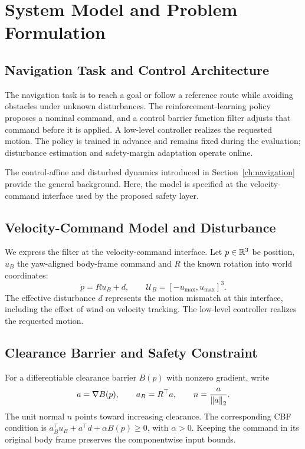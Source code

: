 \chapter{System Model and Problem Formulation}
\label{ch:system}

\section{Navigation Task and Control Architecture}
The navigation task is to reach a goal or follow a reference route while avoiding obstacles under unknown disturbances. The reinforcement-learning policy proposes a nominal command, and a control barrier function filter adjusts that command before it is applied. A low-level controller realizes the requested motion. The policy is trained in advance and remains fixed during the evaluation; disturbance estimation and safety-margin adaptation operate online.

The control-affine and disturbed dynamics introduced in Section~\ref{ch:navigation} provide the general background. Here, the model is specified at the velocity-command interface used by the proposed safety layer.

\section{Velocity-Command Model and Disturbance}
We express the filter at the velocity-command interface. Let $p\in\mathbb R^3$ be position, $u_B$ the yaw-aligned body-frame command and $R$ the known rotation into world coordinates:
\begin{equation}
 \dot p=Ru_B+d,\qquad
 \mathcal U_B=[-u_{\max},u_{\max}]^3.
 \label{eq:contribution_model}
\end{equation}
The effective disturbance $d$ represents the motion mismatch at this interface, including the effect of wind on velocity tracking. The low-level controller realizes the requested motion.

\section{Clearance Barrier and Safety Constraint}
For a differentiable clearance barrier $B(p)$ with nonzero gradient, write
\begin{equation}
 a=\nabla B(p),\qquad a_B=R^\top a,\qquad
 n=\frac{a}{\left\lVert a\right\rVert_2}.
 \label{eq:contribution_normal}
\end{equation}
The unit normal $n$ points toward increasing clearance. The corresponding CBF condition is $a_B^\top u_B+a^\top d+\alpha B(p)\geq0$, with $\alpha>0$. Keeping the command in its original body frame preserves the componentwise input bounds.

